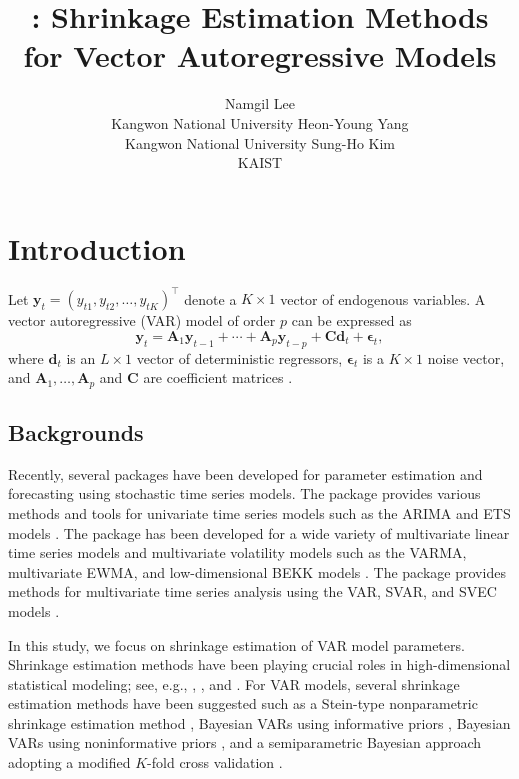 \documentclass[
]{jss}
\author{
Namgil Lee\\Kangwon National University \And Heon-Young Yang\\Kangwon National University \And Sung-Ho Kim\\KAIST
}
\title{\pkg{VARshrink}: Shrinkage Estimation Methods for Vector Autoregressive
Models}
\begin{document}
\hypertarget{introduction}{%
\section{Introduction}\label{introduction}}

\label{sec:intro}

Let \(\mathbf{y}_t = (y_{t1},y_{t2},\ldots,y_{tK})^\top\) denote a
\(K\times 1\) vector of endogenous variables. A vector autoregressive
(VAR) model of order \(p\) can be expressed as
\begin{equation}    \label{VAReqnA}
    \mathbf{y}_t = \mathbf{A}_1 \mathbf{y}_{t-1} + \cdots + \mathbf{A}_p \mathbf{y}_{t-p} + \mathbf{C} \mathbf{d}_t + \boldsymbol\epsilon_t,
    \end{equation} where \(\mathbf{d}_t\) is an \(L\times 1\) vector of
deterministic regressors, \(\boldsymbol\epsilon_t\) is a \(K\times 1\)
noise vector, and \(\mathbf{A}_1,\ldots,\mathbf{A}_p\) and
\(\mathbf{C}\) are coefficient matrices \citep{Hamilton94, Tsay05}.

\hypertarget{backgrounds}{%
\subsection{Backgrounds}\label{backgrounds}}

Recently, several  packages have been developed for
parameter estimation and forecasting using stochastic time series
models. The  package provides various methods and tools
for univariate time series models such as the ARIMA and ETS models
\citep{Hyndman18}. The  package has been developed for a wide
variety of multivariate linear time series models and multivariate
volatility models such as the VARMA, multivariate EWMA, and
low-dimensional BEKK models \citep{Tsay18}. The  package
provides methods for multivariate time series analysis using the VAR,
SVAR, and SVEC models \citep{Pfaff18}.

In this study, we focus on shrinkage estimation of VAR model parameters.
Shrinkage estimation methods have been playing crucial roles in
high-dimensional statistical modeling; see, e.g.,
\citet{Beltra2013shrinkageEEG}, \citet{Bohm2009shrinkage},
\citet{Fiecas2011aoas} and \citet{LedoitWolf2004shrinkcov}. For VAR
models, several shrinkage estimation methods have been suggested such as
a Stein-type nonparametric shrinkage estimation method \citep{Rhein07c},
Bayesian VARs using informative priors
\citep{Banbura10, Doan84, Koop10BayesianVAR, Litterman86}, Bayesian VARs
using noninformative priors \citep{Ni05, Sun04}, and a semiparametric
Bayesian approach adopting a modified \(K\)-fold cross validation
\citep{LeeChoiKim2016}.
\end{document}
